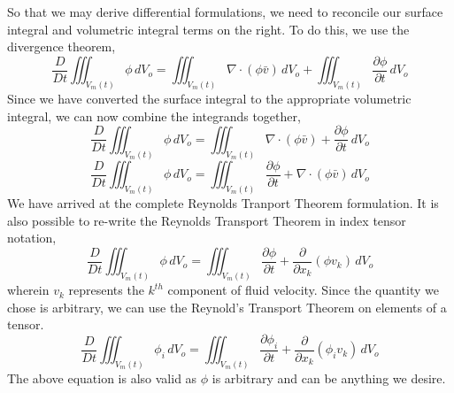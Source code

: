 So that we may derive differential formulations, we need to reconcile our surface integral and volumetric integral terms on the right.
To do this, we use the divergence theorem,
$$\frac{D}{Dt}\iiint^{}_{V_{m}(t)} \phi \,dV_{o} = \iiint^{}_{V_{m}(t)}\nabla \cdot (\phi \bar{v})\,dV_{o} + \iiint^{}_{V_{m}(t)} \frac{\partial \phi}{\partial t} \,dV_{o}$$
Since we have converted the surface integral to the appropriate volumetric integral, we can now combine the integrands together,
$$\frac{D}{Dt}\iiint^{}_{V_{m}(t)} \phi \,dV_{o} = \iiint^{}_{V_{m}(t)}\nabla \cdot (\phi \bar{v}) + \frac{\partial \phi}{\partial t} \,dV_{o}$$
\begin{equation}
\frac{D}{Dt}\iiint^{}_{V_{m}(t)} \phi \,dV_{o} = \iiint^{}_{V_{m}(t)} \frac{\partial \phi}{\partial t} + \nabla \cdot (\phi \bar{v}) \,dV_{o}
\label{Reynolds Transport Theorem Vector Notation}
\end{equation}
We have arrived at the complete Reynolds Tranport Theorem formulation.
It is also possible to re-write the Reynolds Transport Theorem in index tensor notation,
\begin{equation}
\frac{D}{Dt}\iiint^{}_{V_{m}(t)} \phi \,dV_{o} = \iiint^{}_{V_{m}(t)} \frac{\partial \phi}{\partial t} + \frac{\partial}{\partial x_{k}} (\phi v_{k}) \,dV_{o}
\label{Reynolds Transport Theorem Tensor Index Notation}
\end{equation}
wherein $v_{k}$ represents the $k^{th}$ component of fluid velocity.
Since the quantity we chose is arbitrary, we can use the Reynold's Transport Theorem on elements of a tensor.
\begin{equation}
\frac{D}{Dt}\iiint^{}_{V_{m}(t)} \phi_{i} \,dV_{o} = \iiint^{}_{V_{m}(t)} \frac{\partial \phi_{i}}{\partial t} + \frac{\partial}{\partial x_{k}} (\phi_{i} v_{k}) \,dV_{o} 
\label{Reynolds Transport Theorem Tensor Index Notation Arbitrary Argument}
\end{equation}
The above equation is also valid as $\phi$ is arbitrary and can be anything we desire. 


